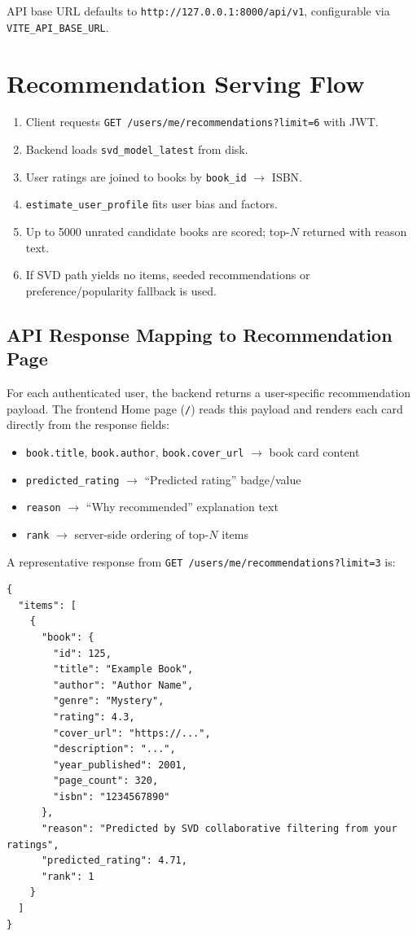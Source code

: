 \documentclass[12pt,a4paper]{report}
\begin{document}
API base URL defaults to \texttt{http://127.0.0.1:8000/api/v1}, configurable via \texttt{VITE\_API\_BASE\_URL}.

\section{Recommendation Serving Flow}
\begin{enumerate}
    \item Client requests \texttt{GET /users/me/recommendations?limit=6} with JWT.
    \item Backend loads \texttt{svd\_model\_latest} from disk.
    \item User ratings are joined to books by \texttt{book\_id} $\rightarrow$ ISBN.
    \item \texttt{estimate\_user\_profile} fits user bias and factors.
    \item Up to 5000 unrated candidate books are scored; top-$N$ returned with reason text.
    \item If SVD path yields no items, seeded recommendations or preference/popularity fallback is used.
\end{enumerate}

\subsection{API Response Mapping to Recommendation Page}

For each authenticated user, the backend returns a user-specific recommendation payload. The frontend Home page (\texttt{/}) reads this payload and renders each card directly from the response fields:
\begin{itemize}
    \item \texttt{book.title}, \texttt{book.author}, \texttt{book.cover\_url} $\rightarrow$ book card content
    \item \texttt{predicted\_rating} $\rightarrow$ ``Predicted rating'' badge/value
    \item \texttt{reason} $\rightarrow$ ``Why recommended'' explanation text
    \item \texttt{rank} $\rightarrow$ server-side ordering of top-$N$ items
\end{itemize}

A representative response from \texttt{GET /users/me/recommendations?limit=3} is:
\begin{small}
\begin{verbatim}
{
  "items": [
    {
      "book": {
        "id": 125,
        "title": "Example Book",
        "author": "Author Name",
        "genre": "Mystery",
        "rating": 4.3,
        "cover_url": "https://...",
        "description": "...",
        "year_published": 2001,
        "page_count": 320,
        "isbn": "1234567890"
      },
      "reason": "Predicted by SVD collaborative filtering from your ratings",
      "predicted_rating": 4.71,
      "rank": 1
    }
  ]
}
\end{verbatim}
\end{small}
\end{document}

